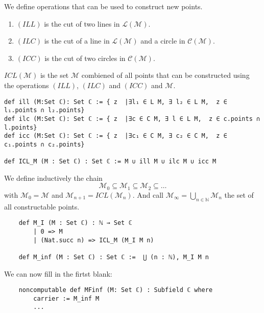 \begin{definition}
    \label{def:rules_to_constructed_a_point}
    We define operations that can be used to construct new points.
    \begin{enumerate}
        \item $(ILL)$ is the cut of two lines in $\mathcal{L(M)}$.
        \item $(ILC)$ is the cut of a line in $\mathcal{L(M)}$ and a circle in $\mathcal{C(M)}$.
        \item $(ICC)$ is the cut of two circles in $\mathcal{C(M)}$.
    \end{enumerate}
    $ICL(\mathcal{M})$ is the set $\mathcal{M}$ combiened of all points that can be constructed using the operations $(ILL)$, $(ILC)$ and $(ICC)$ and $\mathcal{M}$.
\end{definition}

\begin{lstlisting}
def ill (M:Set ℂ): Set ℂ := { z  |∃l₁ ∈ L M, ∃ l₂ ∈ L M,  z ∈ l₁.points ∩ l₂.points}
def ilc (M:Set ℂ): Set ℂ := { z  |∃c ∈ C M, ∃ l ∈ L M,  z ∈ c.points ∩ l.points}
def icc (M:Set ℂ): Set ℂ := { z  |∃c₁ ∈ C M, ∃ c₂ ∈ C M,  z ∈ c₁.points ∩ c₂.points}

def ICL_M (M : Set ℂ) : Set ℂ := M ∪ ill M ∪ ilc M ∪ icc M
\end{lstlisting}

\begin{definition}
    \label{def:set_of_constructable_points}
    We define inductively the chain
    \begin{equation*}
        \mathcal{M}_0 \subseteq \mathcal{M}_1 \subseteq \mathcal{M}_2 \subseteq \dots
    \end{equation*}
    with $\mathcal{M}_0 = \mathcal{M}$ and $\mathcal{M}_{n+1} = ICL(\mathcal{M}_n)$.\newline
    And call $\mathcal{M}_{\infty} = \bigcup_{n \in \mathbb{N}} \mathcal{M}_n$ the set of all constructable points.
\end{definition}

\begin{lstlisting}
    def M_I (M : Set ℂ) : ℕ → Set ℂ
        | 0 => M
        | (Nat.succ n) => ICL_M (M_I M n)

    def M_inf (M : Set ℂ) : Set ℂ :=  ⋃ (n : ℕ), M_I M n
\end{lstlisting}

We can now fill in the firtst blank:
\begin{lstlisting}
    noncomputable def MFinf (M: Set ℂ) : Subfield ℂ where
        carrier := M_inf M
        ...
\end{lstlisting}
